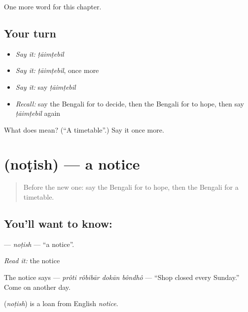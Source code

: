 \begin{grammarlens}[title={What you've built}]
One more word for this chapter.
\end{grammarlens}

\subsection*{Your turn}
\begin{itemize}
\raggedright
  \item \emph{Say it:} \emph{ṭāimṭebil}
  \item \emph{Say it:} \emph{ṭāimṭebil}, once more
  \item \emph{Say it:} say \emph{ṭāimṭebil}
  \item \emph{Recall:} say the Bengali for to decide, then the Bengali for to hope, then say \emph{ṭāimṭebil} again
\end{itemize}

\begin{tcolorbox}[breakable,colback=teal!4,colframe=teal!35!black,title={Before you move on}]
What does  mean? (\textquotedblleft{}A timetable\textquotedblright{}.) Say it once more.
\end{tcolorbox}
\section[\texorpdfstring{\bn{নোটিশ} (noṭish)}{নোটিশ (noṭish)}]{ (noṭish) — a notice}

\label{lesson:BN-C147-notish}



\begin{quote}
Before the new one: say the Bengali for to hope, then the Bengali for a timetable.
\end{quote}

\subsection*{You'll want to know: }
\textbf{} — \emph{noṭish} — \textquotedblleft{}a notice\textquotedblright{}.

\emph{Read it:} the notice

The notice says \textbf{   } — \emph{prôti rôbibār dokān bôndhô} — \textquotedblleft{}Shop closed every Sunday.\textquotedblright{} Come on another day.

\begin{cousinweb}
\textbf{} (\emph{noṭish}) is a loan from English \emph{notice}.
\end{cousinweb}

